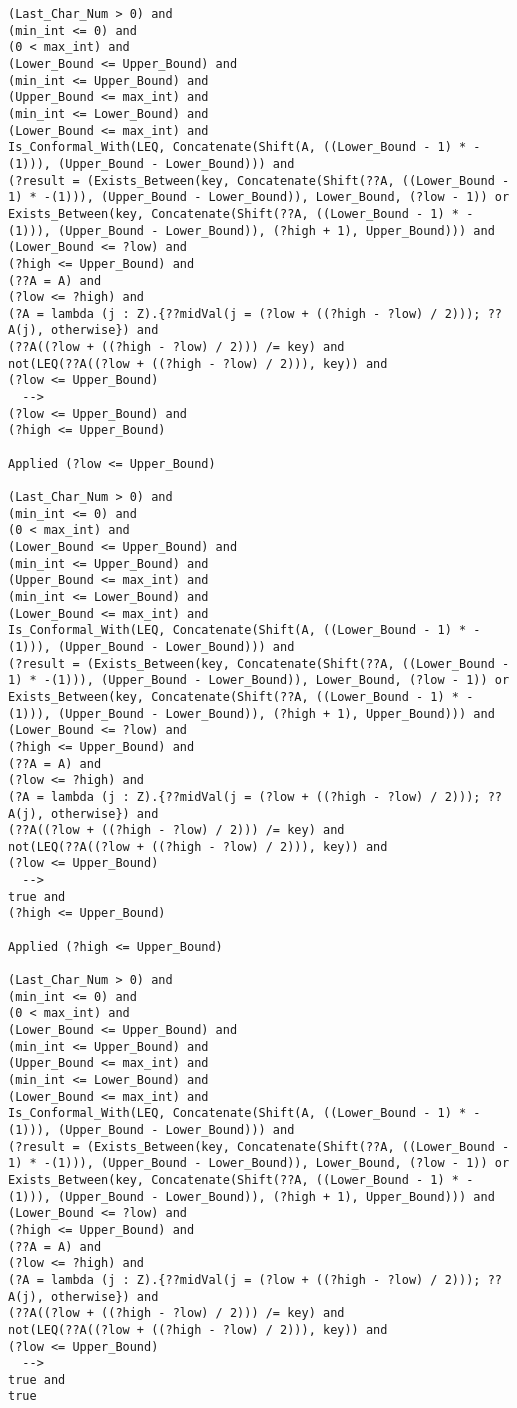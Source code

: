 \begin{lstlisting}[language=resolve]
(Last_Char_Num > 0) and
(min_int <= 0) and
(0 < max_int) and
(Lower_Bound <= Upper_Bound) and
(min_int <= Upper_Bound) and
(Upper_Bound <= max_int) and
(min_int <= Lower_Bound) and
(Lower_Bound <= max_int) and
Is_Conformal_With(LEQ, Concatenate(Shift(A, ((Lower_Bound - 1) * -(1))), (Upper_Bound - Lower_Bound))) and
(?result = (Exists_Between(key, Concatenate(Shift(??A, ((Lower_Bound - 1) * -(1))), (Upper_Bound - Lower_Bound)), Lower_Bound, (?low - 1)) or Exists_Between(key, Concatenate(Shift(??A, ((Lower_Bound - 1) * -(1))), (Upper_Bound - Lower_Bound)), (?high + 1), Upper_Bound))) and
(Lower_Bound <= ?low) and
(?high <= Upper_Bound) and
(??A = A) and
(?low <= ?high) and
(?A = lambda (j : Z).{??midVal(j = (?low + ((?high - ?low) / 2))); ??A(j), otherwise}) and
(??A((?low + ((?high - ?low) / 2))) /= key) and
not(LEQ(??A((?low + ((?high - ?low) / 2))), key)) and
(?low <= Upper_Bound)
  -->
(?low <= Upper_Bound) and
(?high <= Upper_Bound)

Applied (?low <= Upper_Bound)

(Last_Char_Num > 0) and
(min_int <= 0) and
(0 < max_int) and
(Lower_Bound <= Upper_Bound) and
(min_int <= Upper_Bound) and
(Upper_Bound <= max_int) and
(min_int <= Lower_Bound) and
(Lower_Bound <= max_int) and
Is_Conformal_With(LEQ, Concatenate(Shift(A, ((Lower_Bound - 1) * -(1))), (Upper_Bound - Lower_Bound))) and
(?result = (Exists_Between(key, Concatenate(Shift(??A, ((Lower_Bound - 1) * -(1))), (Upper_Bound - Lower_Bound)), Lower_Bound, (?low - 1)) or Exists_Between(key, Concatenate(Shift(??A, ((Lower_Bound - 1) * -(1))), (Upper_Bound - Lower_Bound)), (?high + 1), Upper_Bound))) and
(Lower_Bound <= ?low) and
(?high <= Upper_Bound) and
(??A = A) and
(?low <= ?high) and
(?A = lambda (j : Z).{??midVal(j = (?low + ((?high - ?low) / 2))); ??A(j), otherwise}) and
(??A((?low + ((?high - ?low) / 2))) /= key) and
not(LEQ(??A((?low + ((?high - ?low) / 2))), key)) and
(?low <= Upper_Bound)
  -->
true and
(?high <= Upper_Bound)

Applied (?high <= Upper_Bound)

(Last_Char_Num > 0) and
(min_int <= 0) and
(0 < max_int) and
(Lower_Bound <= Upper_Bound) and
(min_int <= Upper_Bound) and
(Upper_Bound <= max_int) and
(min_int <= Lower_Bound) and
(Lower_Bound <= max_int) and
Is_Conformal_With(LEQ, Concatenate(Shift(A, ((Lower_Bound - 1) * -(1))), (Upper_Bound - Lower_Bound))) and
(?result = (Exists_Between(key, Concatenate(Shift(??A, ((Lower_Bound - 1) * -(1))), (Upper_Bound - Lower_Bound)), Lower_Bound, (?low - 1)) or Exists_Between(key, Concatenate(Shift(??A, ((Lower_Bound - 1) * -(1))), (Upper_Bound - Lower_Bound)), (?high + 1), Upper_Bound))) and
(Lower_Bound <= ?low) and
(?high <= Upper_Bound) and
(??A = A) and
(?low <= ?high) and
(?A = lambda (j : Z).{??midVal(j = (?low + ((?high - ?low) / 2))); ??A(j), otherwise}) and
(??A((?low + ((?high - ?low) / 2))) /= key) and
not(LEQ(??A((?low + ((?high - ?low) / 2))), key)) and
(?low <= Upper_Bound)
  -->
true and
true


\end{lstlisting}
